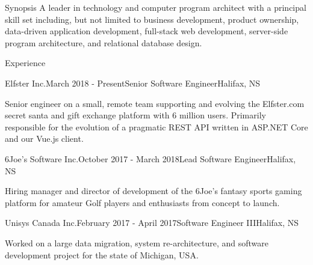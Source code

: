 \documentclass{resume} %
\begin{document}
\begin{rSection}{Synopsis}
A leader in technology and computer program architect with a principal skill set including, but not limited to business development, product ownership, data-driven application development, full-stack web development, server-side program architecture, and relational database design.
\end{rSection}


\begin{rSection}{Experience}

\begin{rSubsection}{Elfster Inc.}{March 2018 - Present}{Senior Software Engineer}{Halifax, NS}

\item[] Senior engineer on a small, remote team supporting and evolving the Elfster.com secret santa and gift exchange platform with 6 million users. Primarily responsible for the evolution of a pragmatic REST API written in ASP.NET Core and our Vue.js client.

\end{rSubsection}


\begin{rSubsection}{6Joe's Software Inc.}{October 2017 - March 2018}{Lead Software Engineer}{Halifax, NS}

\item[] Hiring manager and director of development of the 6Joe's fantasy sports gaming platform for amateur Golf players and enthusiasts from concept to launch.

\end{rSubsection}


\begin{rSubsection}{Unisys Canada Inc.}{February 2017 - April 2017}{Software Engineer III}{Halifax, NS}

\item[] Worked on a large data migration, system re-architecture, and software development project for the state of Michigan, USA.

\end{rSubsection}


\end{rSection}
\end{document}
